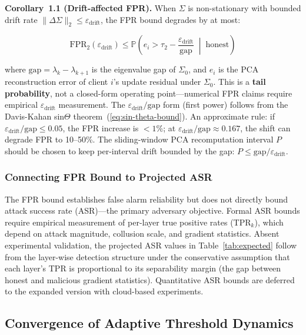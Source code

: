\documentclass[10pt,journal]{IEEEtran}
\begin{document}
\textbf{Corollary~1.1 (Drift-affected FPR).} When $\Sigma$ is non-stationary with bounded drift rate $\|\Delta\Sigma\|_2 \le \varepsilon_{\text{drift}}$, the FPR bound degrades by at most:

\begin{equation}
\text{FPR}_2(\varepsilon_{\text{drift}}) \le \mathbb{P}\!\left(e_i > \tau_2 - \frac{\varepsilon_{\text{drift}}}{\text{gap}} \;\middle|\; \text{honest}\right)
\label{eq:fpr-drift}
\end{equation}

where $\text{gap} = \lambda_k - \lambda_{k+1}$ is the eigenvalue gap of $\Sigma_0$, and $e_i$ is the PCA reconstruction error of client $i$'s update residual under $\Sigma_0$. This is a \textbf{tail probability}, not a closed-form operating point---numerical FPR claims require empirical $\varepsilon_{\text{drift}}$ measurement. The $\varepsilon_{\text{drift}} / \text{gap}$ form (first power) follows from the Davis-Kahan sin$\Theta$ theorem~(\ref{eq:sin-theta-bound}). An approximate rule: if $\varepsilon_{\text{drift}} / \text{gap} \le 0.05$, the FPR increase is $< 1\%$; at $\varepsilon_{\text{drift}} / \text{gap} \approx 0.167$, the shift can degrade FPR to 10--50\%. The sliding-window PCA recomputation interval $P$ should be chosen to keep per-interval drift bounded by the gap: $P \le \text{gap} / \varepsilon_{\text{drift}}$.

\subsubsection{Connecting FPR Bound to Projected ASR}
The FPR bound establishes false alarm reliability but does not directly bound attack success rate (ASR)---the primary adversary objective. Formal ASR bounds require empirical measurement of per-layer true positive rates (TPR$_k$), which depend on attack magnitude, collusion scale, and gradient statistics. Absent experimental validation, the projected ASR values in Table~\ref{tab:expected} follow from the layer-wise detection structure under the conservative assumption that each layer's TPR is proportional to its separability margin (the gap between honest and malicious gradient statistics). Quantitative ASR bounds are deferred to the expanded version with cloud-based experiments.

\subsection{Convergence of Adaptive Threshold Dynamics}\label{sec:convergence}
\end{document}
